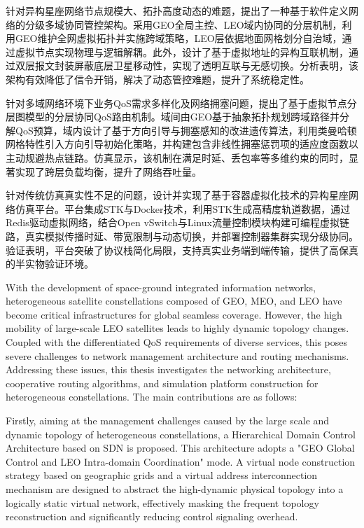 \documentclass[print, master, vlined]{DissertUESTC}
\begin{document}
    针对异构星座网络节点规模大、拓扑高度动态的难题，提出了一种基于软件定义网络的分级多域协同管控架构。采用GEO全局主控、LEO域内协同的分层机制，利用GEO维护全网虚拟拓扑并实施跨域策略，LEO层依据地面网格划分自治域，通过虚拟节点实现物理与逻辑解耦。此外，设计了基于虚拟地址的异构互联机制，通过双层报文封装屏蔽底层卫星移动性，实现了透明互联与无感切换。分析表明，该架构有效降低了信令开销，解决了动态管控难题，提升了系统稳定性。
    
    针对多域网络环境下业务QoS需求多样化及网络拥塞问题，提出了基于虚拟节点分层图模型的分层协同QoS路由机制。域间由GEO基于抽象拓扑规划跨域路径并分解QoS预算，域内设计了基于方向引导与拥塞感知的改进遗传算法，利用类曼哈顿网格特性引入方向引导初始化策略，并构建包含非线性拥塞惩罚项的适应度函数以主动规避热点链路。仿真显示，该机制在满足时延、丢包率等多维约束的同时，显著实现了跨层负载均衡，提升了网络吞吐量。
    
   针对传统仿真真实性不足的问题，设计并实现了基于容器虚拟化技术的异构星座网络仿真平台。平台集成STK与Docker技术，利用STK生成高精度轨道数据，通过Redis驱动虚拟网络，结合Open vSwitch与Linux流量控制模块构建可编程虚拟链路，真实模拟传播时延、带宽限制与动态切换，并部署控制器集群实现分级协同。验证表明，平台突破了协议栈简化局限，支持真实业务端到端传输，提供了高保真的半实物验证环境。
   

 
	
	\enabstract
	With the development of space-ground integrated information networks, heterogeneous satellite constellations composed of GEO, MEO, and LEO have become critical infrastructures for global seamless coverage. However, the high mobility of large-scale LEO satellites leads to highly dynamic topology changes. Coupled with the differentiated QoS requirements of diverse services, this poses severe challenges to network management architecture and routing mechanisms. Addressing these issues, this thesis investigates the networking architecture, cooperative routing algorithms, and simulation platform construction for heterogeneous constellations. The main contributions are as follows:
    
    Firstly, aiming at the management challenges caused by the large scale and dynamic topology of heterogeneous constellations, a Hierarchical Domain Control Architecture based on SDN is proposed. This architecture adopts a "GEO Global Control and LEO Intra-domain Coordination" mode. A virtual node construction strategy based on geographic grids and a virtual address interconnection mechanism are designed to abstract the high-dynamic physical topology into a logically static virtual network, effectively masking the frequent topology reconstruction and significantly reducing control signaling overhead.
    
\end{document}

